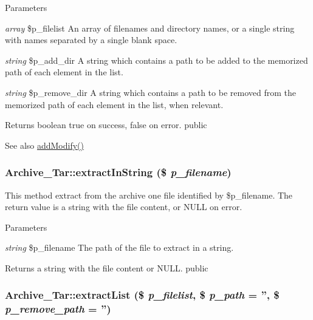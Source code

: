 \begin{DoxyParams}{Parameters}
\item[{\em array}]\$p\_\-filelist An array of filenames and directory names, or a single string with names separated by a single blank space. \item[{\em string}]\$p\_\-add\_\-dir A string which contains a path to be added to the memorized path of each element in the list. \item[{\em string}]\$p\_\-remove\_\-dir A string which contains a path to be removed from the memorized path of each element in the list, when relevant. \end{DoxyParams}
\begin{DoxyReturn}{Returns}
boolean true on success, false on error.  public 
\end{DoxyReturn}
\begin{DoxySeeAlso}{See also}
\hyperlink{classArchive__Tar_a87c8ae9ed359f1caf7d346649d9155a4}{addModify()} 
\end{DoxySeeAlso}
\hypertarget{classArchive__Tar_a6271191374127bc47db5a36fb4776a9f}{
\subsubsection[{extractInString}]{\setlength{\rightskip}{0pt plus 5cm}Archive\_\-Tar::extractInString (\$ {\em p\_\-filename})}}
\label{classArchive__Tar_a6271191374127bc47db5a36fb4776a9f}
This method extract from the archive one file identified by \$p\_\-filename. The return value is a string with the file content, or NULL on error. 
\begin{DoxyParams}{Parameters}
\item[{\em string}]\$p\_\-filename The path of the file to extract in a string. \end{DoxyParams}
\begin{DoxyReturn}{Returns}
a string with the file content or NULL.  public 
\end{DoxyReturn}
\hypertarget{classArchive__Tar_af670430ca3efa3f4850a2cd1347c7d59}{
\subsubsection[{extractList}]{\setlength{\rightskip}{0pt plus 5cm}Archive\_\-Tar::extractList (\$ {\em p\_\-filelist}, \/  \$ {\em p\_\-path} = {\ttfamily ''}, \/  \$ {\em p\_\-remove\_\-path} = {\ttfamily ''})}}
